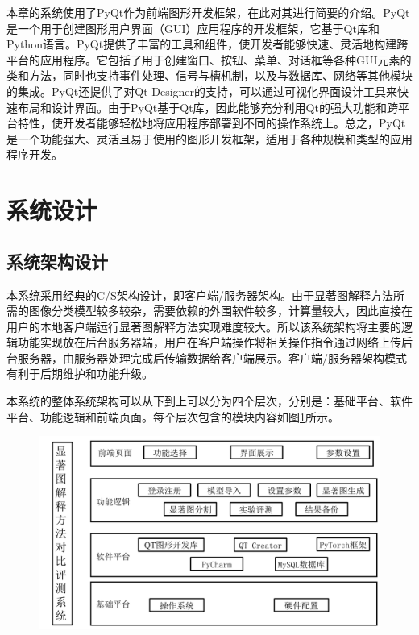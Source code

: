 本章的系统使用了PyQt作为前端图形开发框架，在此对其进行简要的介绍。PyQt是一个用于创建图形用户界面（GUI）应用程序的开发框架，它基于Qt库和Python语言。PyQt提供了丰富的工具和组件，使开发者能够快速、灵活地构建跨平台的应用程序。它包括了用于创建窗口、按钮、菜单、对话框等各种GUI元素的类和方法，同时也支持事件处理、信号与槽机制，以及与数据库、网络等其他模块的集成。PyQt还提供了对Qt Designer的支持，可以通过可视化界面设计工具来快速布局和设计界面。由于PyQt基于Qt库，因此能够充分利用Qt的强大功能和跨平台特性，使开发者能够轻松地将应用程序部署到不同的操作系统上。总之，PyQt是一个功能强大、灵活且易于使用的图形开发框架，适用于各种规模和类型的应用程序开发。

\section{系统设计}
\subsection{系统架构设计}
本系统采用经典的C/S架构设计，即客户端/服务器架构。由于显著图解释方法所需的图像分类模型较多较杂，需要依赖的外围软件较多，计算量较大，因此直接在用户的本地客户端运行显著图解释方法实现难度较大。所以该系统架构将主要的逻辑功能实现放在后台服务器端，用户在客户端操作将相关操作指令通过网络上传后台服务器，由服务器处理完成后传输数据给客户端展示。客户端/服务器架构模式有利于后期维护和功能升级。

本系统的整体系统架构可以从下到上可以分为四个层次，分别是：基础平台、软件平台、功能逻辑和前端页面。每个层次包含的模块内容如图\ref{fig:sys}所示。

\begin{figure}[!ht]
	\centering 
	\includegraphics[width=15cm]{fig/ch5/sys.png}
	\label{fig:sys}
\end{figure}
